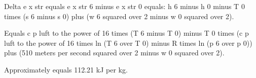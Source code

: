 Delta e x str equals e x str 6 minus e x str 0 equals:
h 6 minus h 0 minus T 0 times (s 6 minus s 0) plus (w 6 squared over 2 minus w 0 squared over 2).

Equals c p luft to the power of 16 times (T 6 minus T 0) minus T 0 times (c p luft to the power of 16 times ln (T 6 over T 0) minus R times ln (p 6 over p 0)) plus (510 meters per second squared over 2 minus w 0 squared over 2).

Approximately equals 112.21 kJ per kg.
